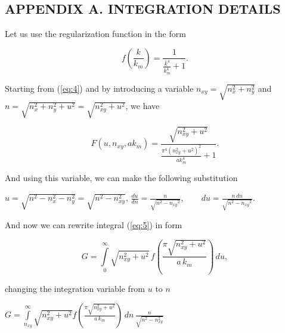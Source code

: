 \documentclass[twoside, 10pt, ptm]{article}
\def\myvspacebeforesubsection{-2.0mm}
\def\myvspaceaftersubsection{-2.5mm}
\begin{document}
\vspace{\myvspacebeforesubsection}
    \subsection*{\centering\uppercase{Appendix A. Integration details}}\label{appendix-a.-integration-details}
\vspace{\myvspaceaftersubsection}

\begin{multicols}{2}
    Let us use the regularization function in the form

\setcounter{equation}{0}
\renewcommand{\theequation}{A.\arabic{equation}}

\begin{equation}
f\left(\frac{k}{k_m}\right) = \frac{1}{\frac{k^{4}}{k_{m}^{4}} + 1}.
\end{equation}


    Starting from (\ref{eq:4}) and by introducing a variable \(n_{xy} = \sqrt{n_x^2 + n_y^2}\) and \(n = \sqrt{n_x^2 + n_y^2 + u^2} = \sqrt{n_{xy}^2 + u^2}\), we have 

\noindent
\begin{equation}
F\left(u, n_{xy}, ak_m\right) = \frac{\sqrt{n_{\mathit{xy}}^{2} + u^{2}}}{\frac{\pi^{4} {\left(n_{\mathit{xy}}^{2} + u^{2}\right)}^{2}}{\mathit{ak}_{m}^{4}} + 1}.
\end{equation}


And using this variable, we can make the following substitution

\vspace{1.5mm}
\(u = \sqrt{n^2 - n_x^2 - n_y^2} = \sqrt{n^2 - n_{xy}^2}\),
\(\frac{du}{dn} = \frac{n}{\sqrt{n^{2} - \mathit{n_{xy}}^{2}}}\), $\,\,\,\,\,\,\,\,\,$
 \(d{u}= \frac{n\,d{n}}{\sqrt{n^{2} - \mathit{n_{xy}}^{2}}}\).

    And now we can rewrite integral (\ref{eq:5}) in form

\begin{equation}
G%
 = \int\limits_{0}^{\infty}\sqrt{n_{xy}^2+u^2}\,
f\left(\frac{\pi\sqrt{n_{xy}^2+u^2}}{a\,k_m}\right)\,d{u},
\end{equation}

changing the integration variable from \(u\) to \(n\)

\noindent
$G%
 = \int\limits_{n_{xy}}^{\infty}\sqrt{n_{xy}^2+u^2}
 f\left(\frac{\pi\sqrt{n_{xy}^2+u^2}}{a\,k_m}\right)\,dn\,{\frac{n}{\sqrt{n^{2} - n_{xy}^{2}}}}$


\end{multicols}
\end{document}
